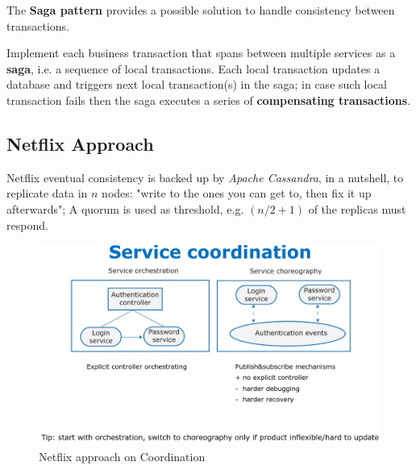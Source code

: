 The \textbf{Saga pattern} provides a possible solution to handle consistency between transactions.

Implement each business transaction that spans between multiple services as a \textbf{saga}, i.e.
a sequence of local transactions.
Each local transaction updates a database and triggers next local transaction(s) in the saga;
in case such local transaction fails then the saga executes a series of \textbf{compensating transactions}.


\subsection{Netflix Approach}

Netflix eventual consistency is backed up by \textit{Apache Cassandra},
in a nutshell, to replicate data in $n$ nodes:
"write to the ones you can get to, then fix it up afterwards";
A quorum is used as threshold, e.g. $(n/2 + 1)$ of the replicas must respond.

\begin{figure}[htbp]
   \centering
   \includegraphics{images/netflix_coordination.png}
   \caption{Netflix approach on Coordination}
   \label{fig:netflix_coordination}
\end{figure}

